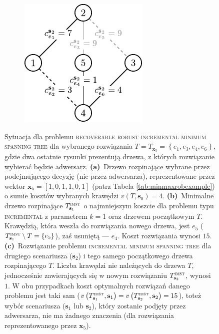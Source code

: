 \begin{figure}[!htbp]
\begin{subfigure}[b]{0.3\textwidth}
		\caption{}
		\label{fig:robincrexample:b}
	\end{subfigure}
	\hfill
	\begin{subfigure}[b]{0.3\textwidth}
		\includegraphics[width=\textwidth]{Chapter_II/ROB-INC-MST-example/c1}
		\caption{}
		\label{fig:robincrexample:c}
	\end{subfigure}
	\hfill\null
	\caption{
		Sytuacja dla problemu \textsc{recoverable robust incremental minimum spanning tree} dla wybranego rozwiązania $T = T_{\textbf{x}_{5}} = \left\{ e_{1}, e_{3}, e_{4}, e_{6} \right\}$, gdzie dwa ostatnie rysunki prezentują drzewa, z których rozwiązanie wybierać będzie adwersarz.
		\textbf{(a)}~Drzewo rozpinające wybrane przez podejmującego decyzję (nie przez adwersarza), reprezentowane przez wektor $\textbf{x}_{5} = \left[ 1, 0, 1, 1, 0, 1 \right]$ (patrz Tabela \ref{tab:minmaxrobexample}) o sumie kosztów wybranych krawędzi $v \left( T, \textbf{s}_{0} \right) = 4$.
		\textbf{(b)}~Minimalne drzewo rozpinające $T^{\textsc{imst}}_{\textbf{s}_{1}}$ o najmniejszym koszcie dla problemu typu \textsc{incremental} z parametrem $k = 1$ oraz drzewem początkowym $T$. Krawędzią, która weszła do rozwiązania nowego drzewa, jest $e_{5}$ ($T^{\textsc{imst}}_{\textbf{s}_{1}} \setminus T = \left\{ e_{5} \right\}$), zaś usuniętą --- $e_{4}$. Koszt rozwiązania wynosi $15$.
		\textbf{(c)}~Rozwiązanie problemu \textsc{incremental minimum spanning tree} dla drugiego scenariusza ($\textbf{s}_{2}$) i tego samego początkowego drzewa rozpinającego $T$. Liczba krawędzi nie należących do drzewa $T$, jednocześnie zawierających się w nowym rozwiązaniu $T^{\textsc{imst}}_{\textbf{s}_{2}}$, wynosi $1$. W obu przypadkach koszt optymalnych rozwiązań danego problemu jest taki sam ($v \left(  T^{\textsc{imst}}_{\textbf{s}_{1}}, \textbf{s}_{1} \right) = v \left(  T^{\textsc{imst}}_{\textbf{s}_{2}}, \textbf{s}_{2} \right) = 15$), toteż wybór scenariusza ($\textbf{s}_{1}$ lub $\textbf{s}_{2}$), który zostanie podjęty przez adwersarza, nie ma żadnego znaczenia (dla rozwiązania reprezentowanego przez $\textbf{x}_{5}$).
}
\end{figure}
